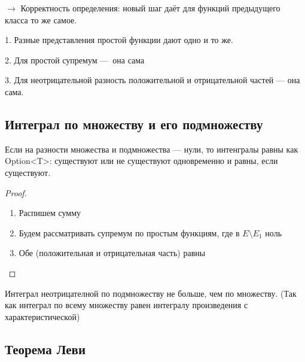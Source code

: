 \documentclass[12pt, a4paper, oneside]{memoir}
\begin{document}
$→$ Корректность определения: новый шаг даёт для функций предыдущего класса то же самое.

1. Разные представления простой функции дают одно и то же.

2. Для простой супремум — она сама

3. Для неотрицательной разность положительной и отрицательной частей — она сама.




\subsection{Интеграл по множеству и его подмножеству}


\begin{theorem}
    Если на разности множества и подмножества — нули, то интенгралы равны как Option<T>: существуют или не существуют одновременно и равны, если существуют.


    \begin{proof}
        \begin{enumerate}
            \item Распишем сумму
            \item Будем рассматривать супремум по простым функциям, где в $E \setminus E_1$ ноль
            \item Обе (положительная и отрицательная часть) равны
        \end{enumerate}
    \end{proof}
\end{theorem}

\begin{corollary}
    Интеграл неотрицателной по подмножеству не больше, чем по множеству. (Так как интеграл по всему множеству равен интегралу произведения с характеристической)
\end{corollary}


\subsection{Теорема Леви}
\end{document}
